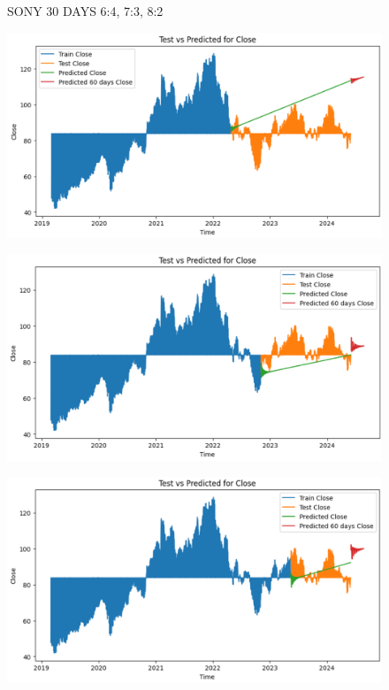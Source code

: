 \documentclass{article}
\begin{document}
\begin{multicols}{2}
\begin{figure}[H]
\begin{minipage}{0.15\textwidth}
    \label{fig:3}
    \end{minipage}
    \caption{SONY 30 DAYS  6:4, 7:3, 8:2 }
\end{figure}

\begin{figure}[H]
    \centering
    \begin{minipage}{0.15\textwidth}
    \centering
    \includegraphics[width=1\textwidth]{Image/VARMA/SONY/6_4/60.png}
   
    \label{fig:1}
    \end{minipage}%
    \begin{minipage}{0.15\textwidth}
    \centering
    \includegraphics[width=1\textwidth]{Image/VARMA/SONY/7_3/60.png}
  
    \label{fig:2}
    \end{minipage}%
    \begin{minipage}{0.15\textwidth}
    \centering
    \includegraphics[width=1\textwidth]{Image/VARMA/SONY/8_2/60.png}


\end{minipage}
\end{figure}
\end{multicols}
\end{document}
